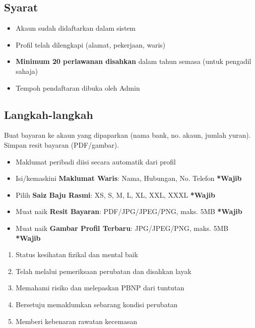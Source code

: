 \documentclass[12pt,a4paper]{report}
\newcommand{\wajib}{\textcolor{dangered}{\small\textbf{*Wajib}}}
\begin{document}
\subsection{Syarat}
\begin{itemize}[label=\textcolor{dangered}{\faExclamationCircle}]
  \item Akaun sudah didaftarkan dalam sistem
  \item Profil telah dilengkapi (alamat, pekerjaan, waris)
  \item \textbf{Minimum 20 perlawanan disahkan} dalam tahun semasa (untuk pengadil sahaja)
  \item Tempoh pendaftaran dibuka oleh Admin
\end{itemize}

\subsection{Langkah-langkah}

\begin{stepbox}
Buat bayaran ke akaun yang dipaparkan (nama bank, no. akaun, jumlah yuran). Simpan resit bayaran (PDF/gambar).
\end{stepbox}

\begin{stepbox}
\begin{itemize}[nosep]
  \item Maklumat peribadi diisi secara automatik dari profil
  \item Isi/kemaskini \textbf{Maklumat Waris}: Nama, Hubungan, No. Telefon \wajib
  \item Pilih \textbf{Saiz Baju Rasmi}: XS, S, M, L, XL, XXL, XXXL \wajib
  \item Muat naik \textbf{Resit Bayaran}: PDF/JPG/JPEG/PNG, maks. 5MB \wajib
  \item Muat naik \textbf{Gambar Profil Terbaru}: JPG/JPEG/PNG, maks. 5MB \wajib
\end{itemize}
\end{stepbox}

\begin{stepbox}
\begin{enumerate}[label=\textcolor{successgreen}{\faCheckSquare}\ , nosep]
  \item Status kesihatan fizikal dan mental baik
  \item Telah melalui pemeriksaan perubatan dan disahkan layak
  \item Memahami risiko dan melepaskan PBNP dari tuntutan
  \item Bersetuju memaklumkan sebarang kondisi perubatan
  \item Memberi kebenaran rawatan kecemasan
\end{enumerate}
\end{stepbox}
\end{document}

